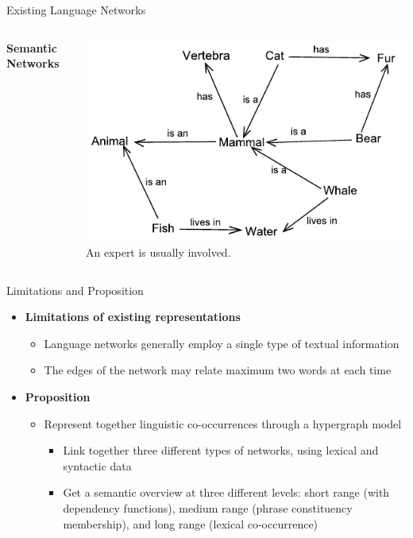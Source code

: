 \documentclass[10pt,xcolor=table]{beamer}
\begin{document}
\begin{frame}{Existing Language Networks}
\begin{columns}
		\textbf{\normalsize Semantic Networks} 
		\begin{minipage}[c][0.3\textheight][c]{\linewidth}
		\includegraphics[width=1\linewidth]{image2/Chapitre2/sem_net.pdf}
		An expert is usually involved.
		\end{minipage}
	\end{columns}

\end{frame}


\begin{frame}{Limitations and Proposition}
\begin{itemize}[<+- | alert@+>]
\item \textbf{Limitations of existing representations}
	\begin{itemize}
	\item Language networks generally employ a single type of textual information
	\item The edges of the network may relate maximum two words at each time
	\end{itemize}
\item \textbf{Proposition}
	\begin{itemize}
	\item Represent together linguistic co-occurrences through a hypergraph model
	\begin{itemize}
	\item Link together three different types of networks, using lexical and syntactic data
	\item Get a semantic overview at three different levels: short range (with dependency functions), medium range (phrase constituency membership), and long range (lexical  co-occurrence) 
	\end{itemize}
	
	\end{itemize}
\end{itemize}
\vspace{\textheight}
\end{frame}
\end{document}
